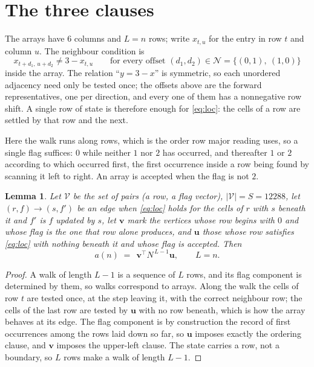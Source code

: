 \documentclass[11pt,a4paper]{article}
\theoremstyle{plain}
\newtheorem{lemma}[theorem]{Lemma}
\theoremstyle{definition}
\begin{document}
\section{The three clauses}

The arrays have $6$ columns and $L=n$ rows; write $x_{t,u}$ for the entry in
row $t$ and column $u$. The neighbour condition is
\begin{equation}\label{eq:loc}
x_{t+d_1,\,u+d_2}\ne 3-x_{t,u}\qquad\text{for every offset }(d_1,d_2)\in\mathcal N=\{(0,1),\ (1,0)\}
\end{equation}
inside the array. The relation ``$y=3-x$'' is symmetric, so each unordered adjacency need
only be tested once; the offsets above are the forward representatives, one per direction,
and every one of them has a nonnegative row shift. A single row of state is therefore
enough for \eqref{eq:loc}: the cells of a row are settled by that row and the next.

Here the walk runs along rows, which is the order row
major reading uses, so a single flag suffices: $0$ while neither $1$ nor $2$ has
occurred, and thereafter $1$ or $2$ according to which occurred first, the first occurrence
inside a row being found by scanning it left to right. An array is accepted when the flag
is not $2$.

\begin{lemma}\label{lem:walk}
Let $\mathcal V$ be the set of pairs (a row, a flag vector), $|\mathcal V|=S=12288$, let
$(r,f)\to(s,f')$ be an edge when \eqref{eq:loc} holds for the cells of $r$ with $s$ beneath
it and $f'$ is $f$ updated by $s$, let $\mathbf{v}$ mark the vertices whose row begins
with $0$ and whose flag is the one that row alone produces, and $\mathbf{u}$ those whose
row satisfies \eqref{eq:loc} with nothing beneath it and whose flag is accepted. Then
\[
a(n)\;=\;\,\mathbf{v}^{\!\top}N^{\,L-1}\mathbf{u},\qquad L=n.
\]
\end{lemma}

\begin{proof}
A walk of length $L-1$ is a sequence of $L$ rows, and its flag component is determined by
them, so walks correspond to arrays. Along the walk the cells of row $t$ are tested once,
at the step leaving it, with the correct neighbour row; the cells of the last row are
tested by $\mathbf{u}$ with no row beneath, which is how the array behaves at its edge.
The flag component is by construction the record of first occurrences among the rows laid
down so far, so $\mathbf{u}$ imposes exactly the ordering clause, and $\mathbf{v}$ imposes
the upper-left clause. The state carries a row, not a boundary, so $L$ rows make a walk
of length $L-1$.
\end{proof}
\end{document}
